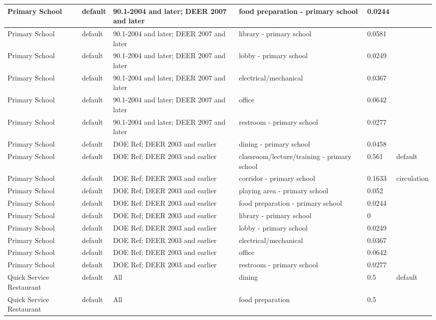 \begin{center}
\begin{longtable}{|p{1.0in}|p{1.05in}|p{1.1in}|p{1.9in}|p{0.55in}|p{0.95in}|}
Primary School & default & 90.1-2004 and later; DEER 2007 and later & food preparation - primary school & 0.0244 &  \\ \hline
Primary School & default & 90.1-2004 and later; DEER 2007 and later & library - primary school & 0.0581 &  \\ \hline
Primary School & default & 90.1-2004 and later; DEER 2007 and later & lobby - primary school & 0.0249 &  \\ \hline
Primary School & default & 90.1-2004 and later; DEER 2007 and later & electrical/mechanical & 0.0367 &  \\ \hline
Primary School & default & 90.1-2004 and later; DEER 2007 and later & office & 0.0642 &  \\ \hline
Primary School & default & 90.1-2004 and later; DEER 2007 and later & restroom - primary school & 0.0277 &  \\ \hline
Primary School & default & DOE Ref; DEER 2003 and earlier & dining - primary school & 0.0458 &  \\ \hline
Primary School & default & DOE Ref; DEER 2003 and earlier & classroom/lecture/training - primary school & 0.561 & default \\ \hline
Primary School & default & DOE Ref; DEER 2003 and earlier & corridor - primary school & 0.1633 & circulation \\ \hline
Primary School & default & DOE Ref; DEER 2003 and earlier & playing area - primary school & 0.052 &  \\ \hline
Primary School & default & DOE Ref; DEER 2003 and earlier & food preparation - primary school & 0.0244 &  \\ \hline
Primary School & default & DOE Ref; DEER 2003 and earlier & library - primary school & 0 &  \\ \hline
Primary School & default & DOE Ref; DEER 2003 and earlier & lobby - primary school & 0.0249 &  \\ \hline
Primary School & default & DOE Ref; DEER 2003 and earlier & electrical/mechanical & 0.0367 &  \\ \hline
Primary School & default & DOE Ref; DEER 2003 and earlier & office & 0.0642 &  \\ \hline
Primary School & default & DOE Ref; DEER 2003 and earlier & restroom - primary school & 0.0277 &  \\ \hline
Quick Service Restaurant & default & All & dining & 0.5 & default \\ \hline
Quick Service Restaurant & default & All & food preparation & 0.5 &  \\ \hline

\end{longtable}
\end{center}
